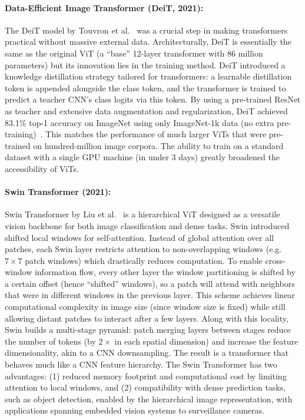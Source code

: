 \documentclass[runningheads,a4paper]{llncs}
\begin{document}
\paragraph{Data-Efficient Image Transformer (DeiT, 2021):} The DeiT model by Touvron et al.~\cite{touvron2021deit} was a crucial step in making transformers practical without massive external data. Architecturally, DeiT is essentially the same as the original ViT (a “base” 12-layer transformer with 86 million parameters) but its innovation lies in the training method. DeiT introduced a knowledge distillation strategy tailored for transformers: a learnable distillation token is appended alongside the class token, and the transformer is trained to predict a teacher CNN’s class logits via this token. By using a pre-trained ResNet as teacher and extensive data augmentation and regularization, DeiT achieved 83.1\% top-1 accuracy on ImageNet using only ImageNet-1k data (no extra pre-training)~\cite{touvron2021deit}. This matches the performance of much larger ViTs that were pre-trained on hundred-million image corpora. The ability to train on a standard dataset with a single GPU machine (in under 3 days) greatly broadened the accessibility of ViTs.

\paragraph{Swin Transformer (2021):} Swin Transformer by Liu et al.~\cite{liu2021swin} is a hierarchical ViT designed as a versatile vision backbone for both image classification and dense tasks. Swin introduced shifted local windows for self-attention. Instead of global attention over all patches, each Swin layer restricts attention to non-overlapping windows (e.g. $7\times7$ patch windows) which drastically reduces computation. To enable cross-window information flow, every other layer the window partitioning is shifted by a certain offset (hence “shifted” windows), so a patch will attend with neighbors that were in different windows in the previous layer. This scheme achieves linear computational complexity in image size (since window size is fixed) while still allowing distant patches to interact after a few layers. Along with this locality, Swin builds a multi-stage pyramid: patch merging layers between stages reduce the number of tokens (by $2\times$ in each spatial dimension) and increase the feature dimensionality, akin to a CNN downsampling. The result is a transformer that behaves much like a CNN feature hierarchy. The Swin Transformer has two advantages: (1) reduced memory footprint and computational cost by limiting attention to local windows, and (2) compatibility with dense prediction tasks, such as object detection, enabled by the hierarchical image representation, with applications spanning embedded vision systems to surveillance cameras.
\end{document}
